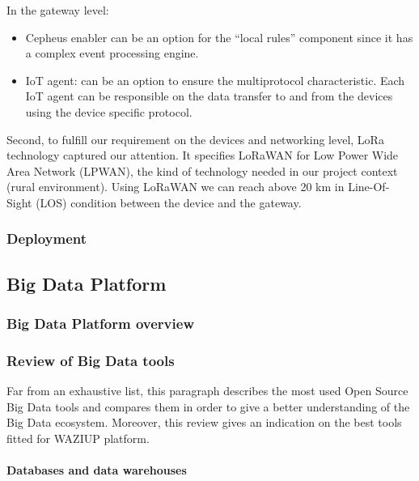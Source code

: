 In the gateway level:
\begin{itemize}
  \item Cepheus enabler can be an option for the “local rules” component since it has a complex event processing engine. 
  \item IoT agent: can be an option to ensure the multiprotocol characteristic. Each IoT agent can be responsible on the data transfer to and from the devices using the device specific protocol. 
\end{itemize}

Second, to fulfill our requirement on the devices and networking level, LoRa technology captured our attention.
It specifies LoRaWAN for Low Power Wide Area Network (LPWAN), the kind of technology needed in our project context (rural environment).
Using LoRaWAN we can reach above 20 km in Line-Of-Sight (LOS) condition between the  device and the gateway. 


\subsubsection{Deployment}



\subsection{Big Data Platform}


\subsubsection{Big Data Platform overview}


\subsubsection{Review of Big Data tools}


Far from an exhaustive list, this paragraph describes the most used Open Source Big Data tools and compares them in order to give a better understanding of the Big Data ecosystem. Moreover, this review gives an indication on the best tools fitted for WAZIUP platform. 


\paragraph{Databases and data warehouses}


